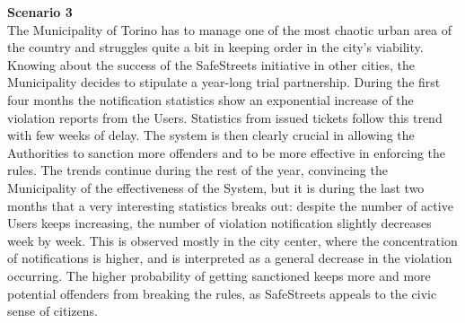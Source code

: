 \documentclass {article}
\begin{document}
		{\bf Scenario 3}\\
		The Municipality of Torino has to manage one of the most chaotic urban area of the country and struggles quite a bit in keeping order in the city’s \mbox{viability}. Knowing about the success of the SafeStreets initiative in other cities, the Municipality decides to stipulate a year-long trial partnership. During the first four months the notification statistics show an exponential increase of the \mbox{violation} reports from the Users. Statistics from issued tickets follow this trend with few weeks of delay. The system is then clearly crucial in allowing the Authorities to sanction more offenders and to be more effective in enforcing the rules. The trends continue during the rest of the year, convincing the \mbox{Municipality} of the effectiveness of the System, but it is during the last two months that a very interesting statistics breaks out: despite the number of active Users keeps increasing, the number of violation notification slightly decreases week by week. This is observed mostly in the city center, where the concentration of notifications is higher, and is interpreted as a general decrease in the violation occurring. The higher probability of getting sanctioned keeps more and more potential offenders from breaking the rules, as SafeStreets appeals to the civic sense of citizens.\\ \\
		\pagebreak
		
\end{document}
